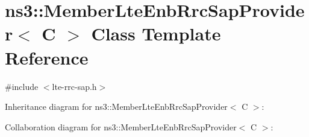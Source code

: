 \hypertarget{classns3_1_1MemberLteEnbRrcSapProvider}{}\section{ns3\+:\+:Member\+Lte\+Enb\+Rrc\+Sap\+Provider$<$ C $>$ Class Template Reference}
\label{classns3_1_1MemberLteEnbRrcSapProvider}


{\ttfamily \#include $<$lte-\/rrc-\/sap.\+h$>$}



Inheritance diagram for ns3\+:\+:Member\+Lte\+Enb\+Rrc\+Sap\+Provider$<$ C $>$\+:


Collaboration diagram for ns3\+:\+:Member\+Lte\+Enb\+Rrc\+Sap\+Provider$<$ C $>$\+:
